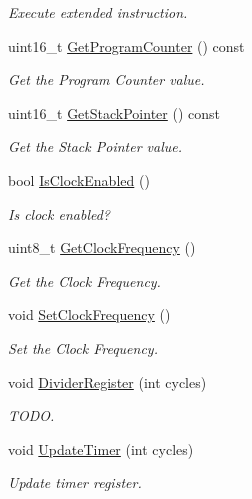 \begin{DoxyCompactItemize}
\begin{DoxyCompactList}\small\item\em Execute extended instruction. \end{DoxyCompactList}\item 
uint16\+\_\+t \mbox{\hyperlink{classCPU_a7882dfef1d06166e828f917368493625}{Get\+Program\+Counter}} () const
\begin{DoxyCompactList}\small\item\em Get the Program Counter value. \end{DoxyCompactList}\item 
uint16\+\_\+t \mbox{\hyperlink{classCPU_a570d34ada158ddb45f8ba8dc0e5f218a}{Get\+Stack\+Pointer}} () const
\begin{DoxyCompactList}\small\item\em Get the Stack Pointer value. \end{DoxyCompactList}\item 
bool \mbox{\hyperlink{classCPU_a66108f133258f1d4348e79f19287d4ed}{Is\+Clock\+Enabled}} ()
\begin{DoxyCompactList}\small\item\em Is clock enabled? \end{DoxyCompactList}\item 
uint8\+\_\+t \mbox{\hyperlink{classCPU_a852335312c1040d2fcde2a690443d425}{Get\+Clock\+Frequency}} ()
\begin{DoxyCompactList}\small\item\em Get the Clock Frequency. \end{DoxyCompactList}\item 
\mbox{\label{classCPU_ab9ecfdbbe82fef8bff9443ff94b7ca70}} 
void \mbox{\hyperlink{classCPU_ab9ecfdbbe82fef8bff9443ff94b7ca70}{Set\+Clock\+Frequency}} ()
\begin{DoxyCompactList}\small\item\em Set the Clock Frequency. \end{DoxyCompactList}\item 
void \mbox{\hyperlink{classCPU_ae6c57423f6edcd249286c73e8e620bb9}{Divider\+Register}} (int cycles)
\begin{DoxyCompactList}\small\item\em T\+O\+DO. \end{DoxyCompactList}\item 
void \mbox{\hyperlink{classCPU_ad8eb59dff5e4fe4c1b2881cc67574ddf}{Update\+Timer}} (int cycles)
\begin{DoxyCompactList}\small\item\em Update timer register. \end{DoxyCompactList}\item 

\end{DoxyCompactItemize}
